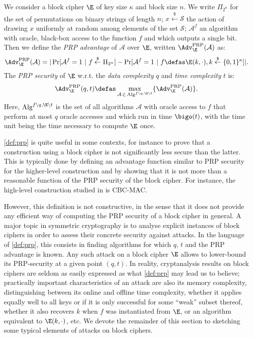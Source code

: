 \begin{defi}
We consider a block cipher $\E$ of key size $\kappa$ and block size $n$.
We write $\Pi_{2^n}$ for the set of permutations on binary strings of length $n$; $x \overset{\$}{\leftarrow} \mathcal{S}$
the action of drawing $x$ uniformly at random among elements of the set $\mathcal{S}$; $\mathcal{A}^{f}$ an algorithm with
oracle, black-box access to the function $f$ and which outputs a single bit.
Then we define the \emph{PRP advantage} of $\mathcal{A}$ over $\E$, written $\Adv^{\text{PRP}}_{\E}(\mathcal{A})$ as:
\[
\Adv^{\text{PRP}}_{\E}(\mathcal{A}) = |\Pr[\mathcal{A}^f = 1~|~f \overset{\$}{\leftarrow} \Pi_{2^n}] - \Pr[\mathcal{A}^f = 1~|~f \defas \E(k,\cdot), k \overset{\$}{\leftarrow} \{0,1\}^\kappa]|.
\]
The \emph{PRP security} of $\E$ w.r.t. the \emph{data complexity} $q$ and \emph{time complexity} $t$ is:
\[
\Adv^{\text{PRP}}_{\E}(q,t) \defas \max_{\mathcal{A}\,\in\,\text{Alg}^{f\backslash q, \E\backslash t}} \{\Adv^{\text{PRP}}_{\E}(\mathcal{A})\}.
\]
Here, $\text{Alg}^{f\backslash q, \E\backslash t}$ is the set of all algorithms $\mathcal{A}$ with oracle access to $f$ that perform at most $q$ oracle accesses
and which run in time $\bigo(t)$, with the time unit being the time necessary to compute $\E$ once.
\label{def:prp}
\end{defi}

\autoref{def:prp} is quite useful in some contexts, for instance to prove that a construction using a block cipher is not significantly less secure than the latter. This is
typically done by defining an advantage function similar to PRP security for the higher-level construction  and by showing that
it is not more than a reasonable function of the PRP security of the block cipher.
For instance, the high-level construction studied in \cite{DBLP:journals/jcss/BellareKR00} is CBC-MAC.

However, this definition is not constructive, in the sense that it does not provide any efficient
way of computing the PRP security of a block cipher in general.
A major topic in symmetric cryptography is to analyse explicit instances of block ciphers
in order to assess their concrete security against attacks. In the language of \autoref{def:prp}, this
consists in finding algorithms for which $q$, $t$ and the PRP advantage is known. Any such attack on a block cipher $\E$ allows to lower-bound its PRP-security at
a given point $(q,t)$.
In reality, cryptanalysis results on block ciphers are seldom as easily expressed as what \autoref{def:prp} may lead us to believe;
practically important characteristics of an attack
are also its memory complexity, distinguishing between its online and offline time complexity, whether it applies equally well to all keys or if it is only successful
for some ``weak'' subset thereof, whether it also recovers $k$ when $f$ was instantiated from $\E$, or an algorithm equivalent to $\E(k,\cdot)$, etc. We devote the remainder of this
section to sketching some typical elements of attacks on block ciphers.

